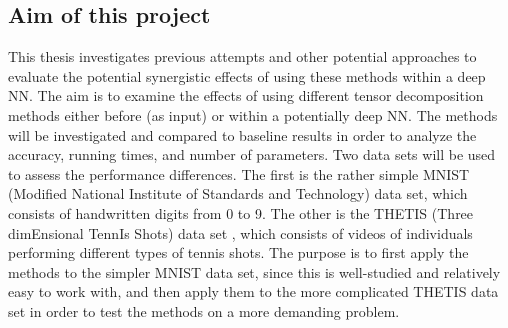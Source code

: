 \subsection{Aim of this project}
This thesis investigates previous attempts and other potential approaches to evaluate the potential synergistic effects of using these methods within a deep NN. The aim is to examine the effects of using different tensor decomposition methods either before (as input) or within a potentially deep NN. The methods will be investigated and compared to baseline results in order to analyze the accuracy, running times, and number of parameters. Two data sets will be used to assess the performance differences. The first is the rather simple MNIST (Modified National Institute of Standards and Technology) data set\cite{MNIST}, which consists of handwritten digits from 0 to 9. The other is the THETIS (Three dimEnsional TennIs Shots) data set \cite{Gourgari2013}, which consists of videos of individuals performing different types of tennis shots. The purpose is to first apply the methods to the simpler MNIST data set, since this is well-studied and relatively easy to work with, and then apply them to the more complicated THETIS data set in order to test the methods on a more demanding problem. 
